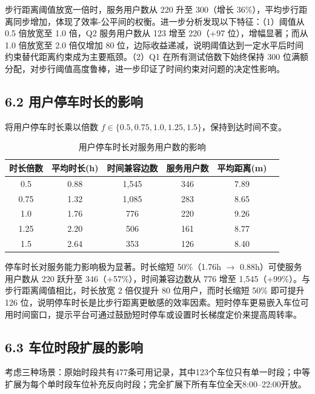 \documentclass{ctexart}
\begin{document}
步行距离阈值放宽一倍时，服务用户数从 220 升至 300（增长 36\%），平均步行距离同步增加，体现了效率-公平间的权衡。进一步分析发现以下特征：（1）阈值从 0.5 倍放宽至 1.0 倍，Q2 服务用户数从 123 增至 220（+97 位），增幅显著；而从 1.0 倍放宽至 2.0 倍仅增加 80 位，边际收益递减，说明阈值达到一定水平后时间约束替代距离约束成为主要瓶颈。（2）Q1 在所有测试倍数下始终保持 300 位满额分配，对步行阈值高度鲁棒，进一步印证了时间约束对问题的决定性影响。

\subsection*{6.2 用户停车时长的影响}

将用户停车时长乘以倍数 $f\in\{0.5,0.75,1.0,1.25,1.5\}$，保持到达时间不变。

\begin{table}[H]
  \centering
  \caption{用户停车时长对服务用户数的影响}
  \label{tab:duration}
  \begin{tabular}{cccccc}
    \toprule
    时长倍数 & 平均时长(h) & 时间兼容边数 & 服务用户数 & 平均距离(m) \\
    \midrule
    0.5  & 0.88    & 1,545  & 346   & 7.89    \\
    0.75 & 1.32    & 1,085  & 283   & 8.65    \\
    1.0  & 1.76    & 776    & 220   & 9.26    \\
    1.25 & 2.20    & 506    & 161   & 8.77    \\
    1.5  & 2.64    & 353    & 126   & 8.40    \\
    \bottomrule
  \end{tabular}
\end{table}

停车时长对服务能力影响极为显著。时长缩短 50\%（1.76h $\to$ 0.88h）可使服务用户数从 220 跃升至 346（+57\%），时间兼容边数从 776 增至 1,545（+99\%）。与步行距离阈值相比，时长放宽 2 倍仅提升 80 位用户，而时长缩短 50\% 即可提升 126 位，说明停车时长是比步行距离更敏感的效率因素。短时停车更易嵌入车位可用时间窗口，提示平台可通过鼓励短时停车或设置时长梯度定价来提高周转率。

\subsection*{6.3 车位时段扩展的影响}

考虑三种场景：原始时段共有477条可用记录，其中123个车位只有单一时段；中等扩展为每个单时段车位补充反向时段；完全扩展下所有车位全天8:00--22:00开放。
\end{document}
